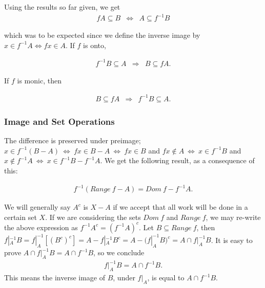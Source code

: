 \documentclass [12pt]{book}
\begin{document}
Using the results so far given, we get \begin{eqnarray}\nonumber fA\subseteq B &\Longleftrightarrow&A\subseteq f^{-1}B\end{eqnarray}

which was to be expected since we define the inverse image by $x\in f^{-1}A\Leftrightarrow fx\in A$. If $f$ is onto,

 \begin{eqnarray}\nonumber  f^{-1}B\subseteq A&\Longrightarrow&B\subseteq fA.\end{eqnarray}

If $f$ is monic, then

 \begin{eqnarray}\nonumber B\subseteq fA&\Longrightarrow&f^{-1}B\subseteq A.\end{eqnarray}

		\subsubsection{Image and Set Operations}

The difference is preserved under preimage; $x\in f^{-1}(B-A)~\Leftrightarrow~fx\in B-A~\Leftrightarrow~fx\in B$ and $fx\notin A~\Leftrightarrow~x\in f^{-1}B$ and $x\notin f^{-1}A~\Leftrightarrow~x\in f^{-1}B-f^{-1}A$. We get the following result, as a consequence of this:

\begin{eqnarray}f^{-1}(Range~f-A)=Dom~f-f^{-1}A.\nonumber\end{eqnarray}

We will generally say $A^c$ is $X-A$ if we accept that all work will be done in a certain set $X$. If we are considering the sets $Dom~f$ and $Range~f$, we may re-write the above expression as $f^{-1}A^c=(f^{-1}A)^c$. Let $B\subseteq Range~f$, then $f|_{A}^{-1}B=f|_{A}^{-1}[(B^c)^c]=A-f|_A^{-1}B^c=A-(f|^{-1}_AB)^c=A\cap f|_A^{-1}B$. It is easy to prove $A\cap f|_A^{-1}B=A\cap f^{-1}B$, so we conclude \begin{eqnarray}f|_A^{-1}B=A\cap f^{-1}B.\end{eqnarray}This means the inverse image of $B$, under $f|_A$, is equal to $A\cap f^{-1}B$.
\end{document}

